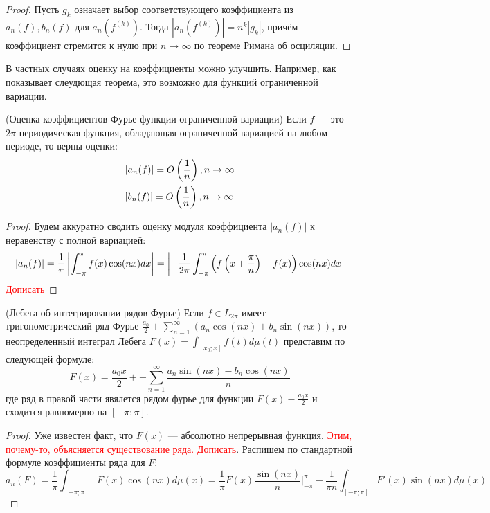 \begin{proof}
	Пусть $g_k$ означает выбор соответствующего коэффициента из $a_n(f), b_n(f)$ для $a_n(f^{(k)})$. Тогда $|a_n(f^{(k)})| = n^k |g_k|$, причём коэффициент стремится к нулю при $n \to \infty$ по теореме Римана об осциляции.
\end{proof}

\begin{note}
	В частных случаях оценку на коэффициенты можно улучшить. Например, как показывает слеудющая теорема, это возможно для функций ограниченной вариации.
\end{note}

\begin{theorem} (Оценка коэффициентов Фурье функции ограниченной вариации)
	Если $f$ --- это $2\pi$-периодическая функция, обладающая ограниченной вариацией на любом периоде, то верны оценки:
	\begin{align*}
		&{|a_n(f)| = O\left(\frac{1}{n}\right), n \to \infty}
		\\
		&{|b_n(f)| = O\left(\frac{1}{n}\right), n \to \infty}
	\end{align*}
\end{theorem}

\begin{proof}
	Будем аккуратно сводить оценку модуля коэффициента $|a_n(f)|$ к неравенству с полной вариацией:
	\[
		|a_n(f)| = \frac{1}{\pi}\left|\int_{-\pi}^\pi f(x)\cos(nx)dx\right| = \left|-\frac{1}{2\pi} \int_{-\pi}^\pi \left(f\left(x + \frac{\pi}{n}\right) - f(x)\right)\cos(nx)dx\right|
	\]
	\textcolor{red}{Дописать}
\end{proof}

\begin{theorem} (Лебега об интегрировании рядов Фурье)
	Если $f \in L_{2\pi}$ имеет тригонометрический ряд Фурье $\frac{a_0}{2} + \sum_{n = 1}^\infty (a_n\cos(nx) + b_n\sin(nx))$, то неопределенный интеграл Лебега $F(x) = \int_{[x_0; x]} f(t)d\mu(t)$ представим по следующей формуле:
	\[
		F(x) = \frac{a_0x}{2} +  + \sum_{n = 1}^\infty \frac{a_n\sin(nx) - b_n\cos(nx)}{n}
	\]
	где ряд в правой части явялется рядом фурье для функции $F(x) - \frac{a_0x}{2}$ и сходится равномерно на $[-\pi; \pi]$.
\end{theorem}

\begin{proof}
	Уже известен факт, что $F(x)$ --- абсолютно непрерывная функция. \textcolor{red}{Этим, почему-то, объясняется существование ряда. Дописать}. Распишем по стандартной формуле коэффициенты ряда для $F$:
	\[
		a_n(F) = \frac{1}{\pi} \int_{[-\pi; \pi]} F(x)\cos(nx)d\mu(x) = \frac{1}{\pi}F(x) \frac{\sin(nx)}{n}|_{-\pi}^\pi - \frac{1}{\pi n} \int_{[-\pi; \pi]} F'(x)\sin(nx)d\mu(x)
	\]
\end{proof}